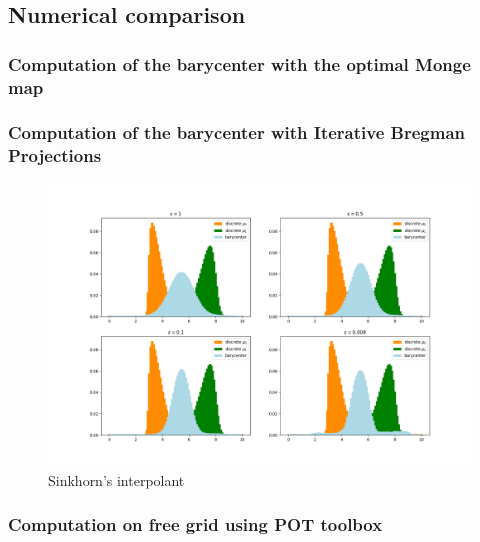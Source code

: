 \subsection{Numerical comparison}
\subsubsection{Computation of the barycenter with the optimal Monge map}
\label{sec:optimal_map}

\cite{peyre_computational_2020}
\subsubsection{Computation of the barycenter with Iterative Bregman Projections}
\begin{figure}
    \centering
    \includegraphics[width=\textwidth]{figures/sinkhorn_1D_2skew.png}
    \caption{Sinkhorn's interpolant}
    \label{fig:sinkhorn_1D_2skew}
\end{figure}

\subsubsection{Computation on free grid using POT toolbox}

